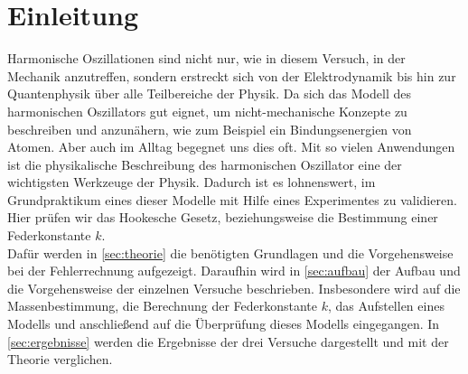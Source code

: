 \chapter{Einleitung}
\label{sec:einleitung}

Harmonische Oszillationen sind nicht nur, wie in diesem Versuch, in der Mechanik anzutreffen, sondern erstreckt sich von der Elektrodynamik bis hin zur Quantenphysik über alle Teilbereiche der Physik. Da sich das Modell des harmonischen Oszillators gut eignet, um nicht-mechanische Konzepte zu beschreiben und anzunähern, wie zum Beispiel ein Bindungsenergien von Atomen. Aber auch im Alltag begegnet uns dies oft. Mit so vielen Anwendungen ist die physikalische Beschreibung des harmonischen Oszillator eine der wichtigsten Werkzeuge der Physik. Dadurch ist es lohnenswert, im Grundpraktikum eines dieser Modelle mit Hilfe eines Experimentes zu validieren. Hier prüfen wir das Hookesche Gesetz, beziehungsweise die Bestimmung einer Federkonstante $k$.\\
Dafür werden in \autoref{sec:theorie} die benötigten Grundlagen und die Vorgehensweise bei der Fehlerrechnung aufgezeigt. Daraufhin wird in \autoref{sec:aufbau} der Aufbau und die Vorgehensweise der einzelnen Versuche beschrieben. Insbesondere wird auf die Massenbestimmung, die Berechnung der Federkonstante $k$, das Aufstellen eines Modells und anschließend auf die Überprüfung dieses Modells eingegangen. In \autoref{sec:ergebnisse} werden die Ergebnisse der drei Versuche dargestellt und mit der Theorie verglichen.
